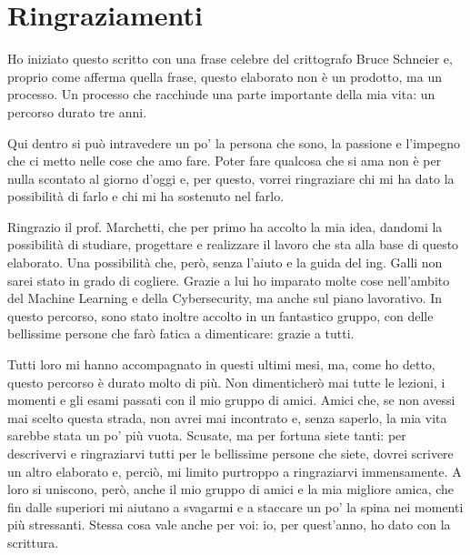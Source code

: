 \chapter*{Ringraziamenti}
\thispagestyle{empty}

Ho iniziato questo scritto con una frase celebre del crittografo Bruce Schneier e, proprio come afferma quella frase, questo elaborato non è un prodotto, ma un processo.
Un processo che racchiude una parte importante della mia vita: un percorso durato tre anni.

Qui dentro si può intravedere un po' la persona che sono, la passione e l'impegno che ci metto nelle cose che amo fare.
Poter fare qualcosa che si ama non è per nulla scontato al giorno d'oggi e, per questo, vorrei ringraziare chi mi ha dato la possibilità di farlo e chi mi ha sostenuto nel farlo.

Ringrazio il prof. Marchetti, che per primo ha accolto la mia idea, dandomi la possibilità di studiare, progettare e realizzare il lavoro che sta alla base di questo elaborato.
Una possibilità che, però, senza l'aiuto e la guida del ing. Galli non sarei stato in grado di cogliere.
Grazie a lui ho imparato molte cose nell'ambito del Machine Learning e della Cybersecurity, ma anche sul piano lavorativo. 
In questo percorso, sono stato inoltre accolto in un fantastico gruppo, con delle bellissime persone che farò fatica a dimenticare: grazie a tutti.

Tutti loro mi hanno accompagnato in questi ultimi mesi, ma, come ho detto, questo percorso è durato molto di più.
Non dimenticherò mai tutte le lezioni, i momenti e gli esami passati con il mio gruppo di amici.
Amici che, se non avessi mai scelto questa strada, non avrei mai incontrato e, senza saperlo, la mia vita sarebbe stata un po' più vuota.
Scusate, ma per fortuna siete tanti: per descrivervi e ringraziarvi tutti per le bellissime persone che siete, dovrei scrivere un altro elaborato e, perciò, mi limito purtroppo a ringraziarvi immensamente.
A loro si uniscono, però, anche il mio gruppo di amici e la mia migliore amica, che fin dalle superiori mi aiutano a svagarmi e a staccare un po' la spina nei momenti più stressanti.
Stessa cosa vale anche per voi: io, per quest'anno, ho dato con la scrittura.

